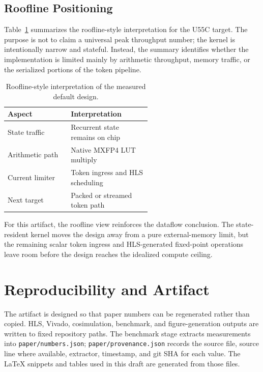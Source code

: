 \documentclass[conference]{IEEEtran}
\begin{document}
\subsection{Roofline Positioning}

Table~\ref{tab:roofline} summarizes the roofline-style interpretation for the
U55C target. The purpose is not to claim a universal peak throughput number; the
kernel is intentionally narrow and stateful. Instead, the summary identifies
whether the implementation is limited mainly by arithmetic throughput, memory
traffic, or the serialized portions of the token pipeline.

\begin{table}[t]
  \centering
  \caption{Roofline-style interpretation of the measured default design.}
  \label{tab:roofline}
  \begin{tabular}{lp{0.56\linewidth}}
  \toprule
  Aspect & Interpretation \\
  \midrule
  State traffic & Recurrent state remains on chip \\
  Arithmetic path & Native MXFP4 LUT multiply \\
  Current limiter & Token ingress and HLS scheduling \\
  Next target & Packed or streamed token path \\
  \bottomrule
  \end{tabular}
\end{table}

For this artifact, the roofline view reinforces the dataflow conclusion. The
state-resident kernel moves the design away from a pure external-memory limit,
but the remaining scalar token ingress and HLS-generated fixed-point operations
leave room before the design reaches the idealized compute ceiling.

\section{Reproducibility and Artifact}

The artifact is designed so that paper numbers can be regenerated rather than
copied. HLS, Vivado, cosimulation, benchmark, and figure-generation outputs are
written to fixed repository paths. The benchmark stage extracts measurements
into \texttt{paper/numbers.json}; \texttt{paper/provenance.json} records the
source file, source line where available, extractor, timestamp, and git SHA for
each value. The LaTeX snippets and tables used in this draft are generated from
those files.
\end{document}
